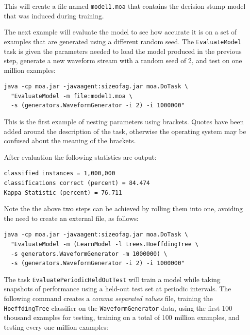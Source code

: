 \documentclass[a4paper,12pt,twoside]{book}
\begin{document}
This will create a file named \verb+model1.moa+ that contains the decision stump model that was induced during training.

The next example will evaluate the model to see how accurate it is on a set of examples that are generated using a different random seed. The \verb+EvaluateModel+ task is given the parameters needed to load the model produced in the previous step, generate a new waveform stream with a random seed of 2, and test on one million examples:

\begin{footnotesize}\begin{verbatim}
java -cp moa.jar -javaagent:sizeofag.jar moa.DoTask \
  "EvaluateModel -m file:model1.moa \
  -s (generators.WaveformGenerator -i 2) -i 1000000"
\end{verbatim}\end{footnotesize}

This is the first example of nesting parameters using brackets. Quotes have been added around the description of the task, otherwise the operating system may be confused about the meaning of the brackets.

After evaluation the following statistics are output:

\begin{footnotesize}\begin{verbatim}
classified instances = 1,000,000
classifications correct (percent) = 84.474
Kappa Statistic (percent) = 76.711
\end{verbatim}\end{footnotesize}

Note the the above two steps can be achieved by rolling them into one, avoiding the need to create an external file, as follows:

\begin{footnotesize}\begin{verbatim}
java -cp moa.jar -javaagent:sizeofag.jar moa.DoTask \
  "EvaluateModel -m (LearnModel -l trees.HoeffdingTree \
  -s generators.WaveformGenerator -m 1000000) \
  -s (generators.WaveformGenerator -i 2) -i 1000000"
\end{verbatim}\end{footnotesize}

The task \verb+EvaluatePeriodicHeldOutTest+ will train a model while taking snapshots of performance using a held-out test set at periodic intervals.
The following command creates a {\em comma separated values} file, training the \verb+HoeffdingTree+ classifier on the \verb+WaveformGenerator+ data, using the first 100 thousand examples for testing, training on a total of 100 million examples, and testing every one million examples:
\end{document}
